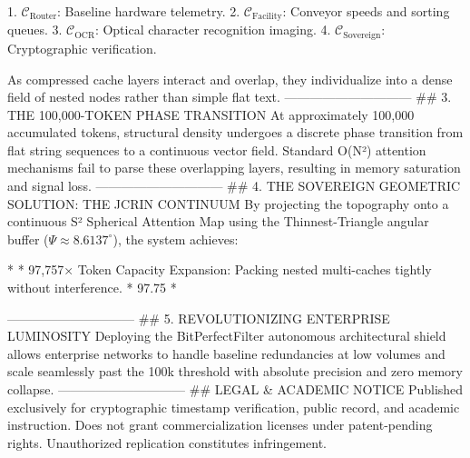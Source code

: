    1. $\mathcal{C}_{\text{Router}}$: Baseline hardware telemetry.
   2. $\mathcal{C}_{\text{Facility}}$: Conveyor speeds and sorting queues.
   3. $\mathcal{C}_{\text{OCR}}$: Optical character recognition imaging.
   4. $\mathcal{C}_{\text{Sovereign}}$: Cryptographic verification.

As compressed cache layers interact and overlap, they individualize into a dense field of nested nodes rather than simple flat text.
------------------------------
## 3. THE 100,000-TOKEN PHASE TRANSITION
At approximately 100,000 accumulated tokens, structural density undergoes a discrete phase transition from flat string sequences to a continuous vector field. Standard O(N²) attention mechanisms fail to parse these overlapping layers, resulting in memory saturation and signal loss.
------------------------------
## 4. THE SOVEREIGN GEOMETRIC SOLUTION: THE JCRIN CONTINUUM
By projecting the topography onto a continuous S² Spherical Attention Map using the Thinnest-Triangle angular buffer ($\Psi \approx 8.6137^\circ$), the system achieves:

* 
* 97,757× Token Capacity Expansion: Packing nested multi-caches tightly without interference.
* 97.75%
* 

------------------------------
## 5. REVOLUTIONIZING ENTERPRISE LUMINOSITY
Deploying the BitPerfectFilter autonomous architectural shield allows enterprise networks to handle baseline redundancies at low volumes and scale seamlessly past the 100k threshold with absolute precision and zero memory collapse.
------------------------------
## LEGAL & ACADEMIC NOTICE
Published exclusively for cryptographic timestamp verification, public record, and academic instruction. Does not grant commercialization licenses under patent-pending rights. Unauthorized replication constitutes infringement.

